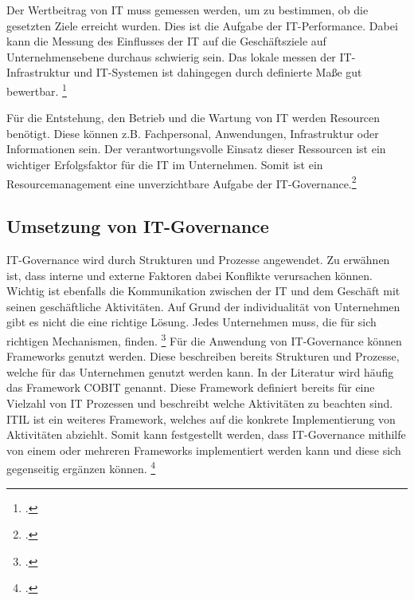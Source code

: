 Der Wertbeitrag von IT muss gemessen werden, um zu bestimmen, ob die gesetzten Ziele erreicht wurden. Dies ist die Aufgabe der IT-Performance. Dabei kann die Messung des Einflusses der IT auf die Geschäftsziele auf Unternehmensebene durchaus schwierig sein. Das lokale messen der IT-Infrastruktur und IT-Systemen ist dahingegen durch definierte Maße gut bewertbar. \footcite[Vgl.][361]{hofmann_it-governance_2010}

Für die Entstehung, den Betrieb und die Wartung von IT werden Resourcen benötigt. Diese können z.B. Fachpersonal, Anwendungen, Infrastruktur oder Informationen sein. Der verantwortungsvolle Einsatz dieser Ressourcen ist ein wichtiger Erfolgsfaktor für die IT im Unternehmen. Somit ist ein Resourcemanagement eine unverzichtbare Aufgabe der IT-Governance.\footcite[Vgl.][362]{hofmann_it-governance_2010}

\subsection{Umsetzung von IT-Governance}

IT-Governance wird durch Strukturen und Prozesse angewendet. Zu erwähnen ist, dass interne und externe Faktoren dabei Konflikte verursachen können. Wichtig ist ebenfalls die Kommunikation zwischen der IT und dem Geschäft mit seinen geschäftliche Aktivitäten. Auf Grund der individualität von Unternehmen gibt es nicht die eine richtige Lösung. Jedes Unternehmen muss, die für sich richtigen Mechanismen, finden. \footcite[Vgl.][27]{de_haes_it_2004}
\nopagebreak
Für die Anwendung von IT-Governance können Frameworks genutzt werden. Diese beschreiben bereits Strukturen und Prozesse, welche für das Unternehmen genutzt werden kann. In der Literatur wird häufig das Framework \gls{COBIT} genannt. Diese Framework definiert bereits für eine Vielzahl von IT Prozessen und beschreibt welche Aktivitäten zu beachten sind. \gls{ITIL} ist ein weiteres Framework, welches auf die konkrete Implementierung von Aktivitäten abziehlt. 
Somit kann festgestellt werden, dass IT-Governance mithilfe von einem oder mehreren Frameworks implementiert werden kann und diese sich gegenseitig ergänzen können. \footcite[Vgl.][29\psqq]{de_haes_it_2004}


